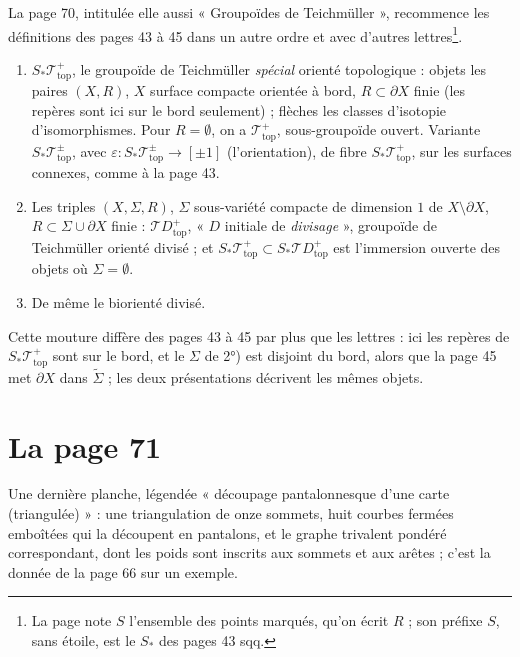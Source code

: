 \documentclass[11pt,a4paper]{article}
\begin{document}
La page 70, intitulée elle aussi « Groupoïdes de Teichmüller », recommence les
définitions des pages 43 à 45 dans un autre ordre et avec d'autres
lettres\footnote{La page note $S$ l'ensemble des points marqués, qu'on écrit
$R$ ; son préfixe $S$, sans étoile, est le $S_{*}$ des pages 43 sqq.}.
\begin{enumerate}
\item[1)] $S_{*}\mathcal{T}^{+}_{\mathrm{top}}$, le groupoïde de Teichmüller
\emph{spécial} orienté topologique : objets les paires $(X, R)$, $X$ surface
compacte orientée à bord, $R \subset \partial X$ finie (les repères sont ici sur
le bord seulement) ; flèches les classes d'isotopie d'isomorphismes. Pour $R =
\emptyset$, on a $\mathcal{T}^{+}_{\mathrm{top}}$, sous-groupoïde ouvert. Variante
$S_{*}\mathcal{T}^{\pm}_{\mathrm{top}}$, avec $\varepsilon :
S_{*}\mathcal{T}^{\pm}_{\mathrm{top}} \to [\pm 1]$ (l'orientation), de fibre
$S_{*}\mathcal{T}^{+}_{\mathrm{top}}$, sur les surfaces connexes, comme à la
page 43.
\item[2°)] Les triples $(X, \Sigma, R)$, $\Sigma$ sous-variété compacte de
dimension $1$ de $X \setminus \partial X$, $R \subset \Sigma \cup \partial X$
finie : $\mathcal{T}D^{+}_{\mathrm{top}}$, « $D$ initiale de \emph{divisage} »,
groupoïde de Teichmüller orienté divisé ; et $S_{*}\mathcal{T}^{+}_{\mathrm{top}}
\subset S_{*}\mathcal{T}D^{+}_{\mathrm{top}}$ est l'immersion ouverte des objets
où $\Sigma = \emptyset$.
\item[3°)] De même le biorienté divisé.
\end{enumerate}
Cette mouture diffère des pages 43 à 45 par plus que les lettres : ici les repères
de $S_{*}\mathcal{T}^{+}_{\mathrm{top}}$ sont sur le bord, et le $\Sigma$ de 2°)
est disjoint du bord, alors que la page 45 met $\partial X$ dans
$\widetilde{\Sigma}$ ; les deux présentations décrivent les mêmes objets.

\section*{La page 71}

Une dernière planche, légendée « découpage pantalonnesque d'une carte
(triangulée) » : une triangulation de onze sommets, huit courbes fermées
emboîtées qui la découpent en pantalons, et le graphe trivalent pondéré
correspondant, dont les poids sont inscrits aux sommets et aux arêtes ; c'est la
donnée de la page 66 sur un exemple.
\end{document}
